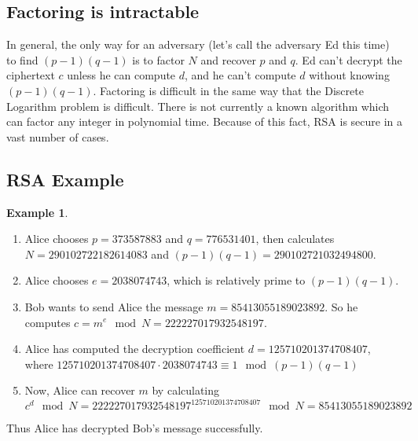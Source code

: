 \documentclass[10pt]{article}
\theoremstyle{definition}
\newtheorem{ex}[theorem]{Example}
\theoremstyle{remark}
\begin{document}
\subsection{Factoring is intractable}
In general, the only way for an adversary (let's call the adversary Ed this time) to find $(p-1)(q-1)$ is to factor $N$ and recover $p$ and $q$.  Ed can't decrypt the ciphertext $c$ unless he can compute $d$, and he can't compute $d$ without knowing $(p-1)(q-1)$.  Factoring is difficult in the same way that the Discrete Logarithm problem is difficult.  There is not currently a known algorithm which can factor any integer in polynomial time.  Because of this fact, RSA is secure in a vast number of cases.
\subsection{RSA Example}
\begin{ex}
\begin{enumerate}
\item Alice chooses $p=373587883$ and $q=776531401$, then calculates $N = 290102722182614083$ and $(p-1)(q-1)=290102721032494800$.
\item Alice chooses $e=2038074743$, which is relatively prime to $(p-1)(q-1)$.
\item Bob wants to send Alice the message $m = 85413055189023892$.  So he computes $c = m^e \mod N = 222227017932548197$.
\item Alice has computed the decryption coefficient $d=125710201374708407$, where $125710201374708407 \cdot 2038074743 \equiv 1 \mod (p-1)(q-1)$
\item Now, Alice can recover $m$ by calculating $c^d \mod N = 222227017932548197^125710201374708407 \mod N = 85413055189023892$
\end{enumerate}
Thus Alice has decrypted Bob's message successfully.
\end{ex}
\end{document}
